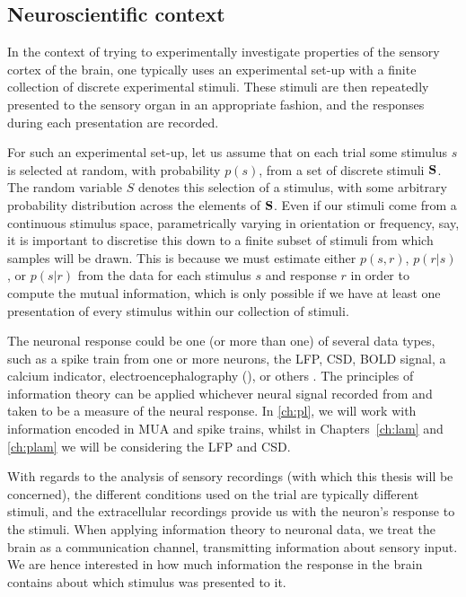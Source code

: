 \subsection{Neuroscientific context}

In the context of trying to experimentally investigate properties of the sensory cortex of the brain, one typically uses an experimental set-up with a finite collection of discrete experimental stimuli.
These stimuli are then repeatedly presented to the sensory organ in an appropriate fashion, and the responses during each presentation are recorded.

For such an experimental set-up, let us assume that on each trial some stimulus $s$ is selected at random, with probability $p(s)$, from a set of discrete stimuli $\mathbf{S}$.
The random variable $S$ denotes this selection of a stimulus, with some arbitrary probability distribution across the elements of $\mathbf{S}$.
Even if our stimuli come from a continuous stimulus space, parametrically varying in orientation or frequency, say, it is important to discretise this down to a finite subset of stimuli from which samples will be drawn.
This is because we must estimate either $p(s,r)$, $p(r|s)$, or $p(s|r)$ from the data for each stimulus $s$ and response $r$ in order to compute the mutual information, which is only possible if we have at least one presentation of every stimulus within our collection of stimuli.

The neuronal response could be one (or more than one) of several data types, such as a spike train from one or more neurons, the \ac{LFP}, \ac{CSD}, \ac{BOLD} signal, a calcium indicator, electroencephalography (), or others \citep{Magri2009,Quiroga2009}.
The principles of information theory can be applied whichever neural signal recorded from and taken to be a measure of the neural response.
In \autoref{ch:pl}, we will work with information encoded in \ac{MUA} and spike trains, whilst in Chapters~\ref{ch:lam} and \ref{ch:plam} we will be considering the \ac{LFP} and \ac{CSD}.

With regards to the analysis of sensory recordings (with which this thesis will be concerned), the different conditions used on the trial are typically different stimuli, and the extracellular recordings provide us with the neuron's response to the stimuli.
When applying information theory to neuronal data, we treat the brain as a communication channel, transmitting information about sensory input.
We are hence interested in how much information the response in the brain contains about which stimulus was presented to it.

